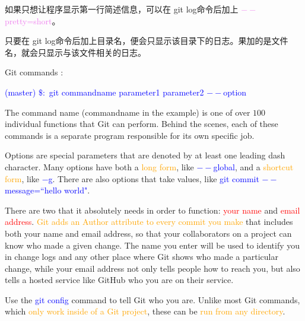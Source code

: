 \documentclass[12pt,a4paper]{article}
\begin{document}
如果只想让程序显示第一行简述信息，可以在 git log命令后加上 \textcolor{violet}{$--$pretty=short}。

只要在 git log命令后加上目录名，便会只显示该目录下的日志。果加的是文件名，就会只显示与该文件相关的日志。






Git commands :

\textcolor{blue}{(master) $\$:$ git commandname parameter1 parameter2 $--$option}

The command name (commandname in the example) is one of over $100$ individual functions that Git can perform. Behind the scenes, each of these commands is a separate program responsible for its own specific job. 

Options are special parameters that are denoted by at least one leading dash character. Many options have both a \textcolor{orange}{long form}, like \textcolor{blue}{$--$global}, and a \textcolor{orange}{shortcut form}, like \textcolor{blue}{$-$g}. There are also options that take values, like \textcolor{blue}{git commit $--$message=``hello world"}.

There are two that it absolutely needs in order to function: \textcolor{red}{your name} and \textcolor{red}{email address}. \textcolor{orange}{Git adds an Author attribute to every commit you make} that includes both your name and email address, so that your collaborators on a project can know who made a given change. The name you enter will be used to identify you in change logs and any other place where Git shows who made a particular change, while your email address
not only tells people how to reach you, but also tells a hosted service like GitHub who you are on their service.

Use the \textcolor{blue}{git config} command to tell Git who you are. Unlike most Git commands, which \textcolor{orange}{only work inside of a Git project}, these can be \textcolor{orange}{run from any directory}. 



\end{document}

